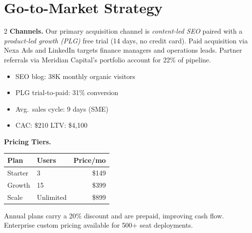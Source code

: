 \section{\sectionicon{\faRocket}Go-to-Market Strategy}

\begin{multicols}{2}
\textbf{Channels.} Our primary acquisition channel is \textit{content-led SEO} paired with
a \textit{product-led growth (PLG)} free trial (14 days, no credit card). Paid
acquisition via Nexa Ads and LinkedIn targets finance managers and operations leads.
Partner referrals via Meridian Capital's portfolio account for 22\% of pipeline.

\vspace{4pt}
\begin{itemize}[leftmargin=14pt, itemsep=2pt]
  \item[\textcolor{NexaTeal}{\faChevronRight}] SEO blog: 38K monthly organic visitors
  \item[\textcolor{NexaTeal}{\faChevronRight}] PLG trial-to-paid: 31\% conversion
  \item[\textcolor{NexaTeal}{\faChevronRight}] Avg.\ sales cycle: 9 days (SME)
  \item[\textcolor{NexaTeal}{\faChevronRight}] CAC: \$210 \textbar{} LTV: \$4,100
\end{itemize}

\columnbreak

\textbf{Pricing Tiers.}
\begin{tabular}{@{}llr@{}}
  \toprule
  \textbf{Plan} & \textbf{Users} & \textbf{Price/mo} \\
  \midrule
  Starter   & 3  & \$149 \\
  Growth    & 15 & \$399 \\
  Scale     & Unlimited & \$899 \\
  \bottomrule
\end{tabular}

\vspace{6pt}
Annual plans carry a 20\% discount and are prepaid, improving cash flow. Enterprise
custom pricing available for 500+ seat deployments.
\end{multicols}

